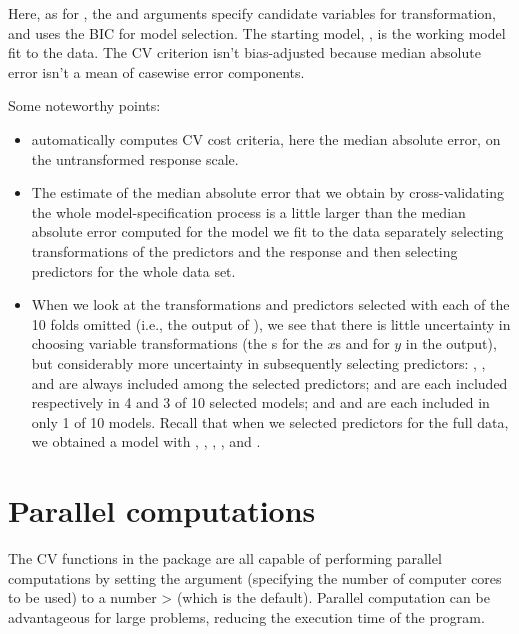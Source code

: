 \documentclass[
]{jss}
\providecommand{\tightlist}{%
  \setlength{\itemsep}{0pt}\setlength{\parskip}{0pt}}
\begin{document}
Here, as for , the  and
 arguments specify candidate variables for
transformation, and  uses the BIC for model selection.
The starting model, , is the working model fit to the
 data. The CV criterion isn't bias-adjusted because median
absolute error isn't a mean of casewise error components.

Some noteworthy points:

\begin{itemize}
\tightlist
\item
   automatically computes CV cost criteria,
  here the median absolute error, on the untransformed response scale.
\item
  The estimate of the median absolute error that we obtain by
  cross-validating the whole model-specification process is a little
  larger than the median absolute error computed for the model we fit to
  the  data separately selecting transformations of the
  predictors and the response and then selecting predictors for the
  whole data set.
\item
  When we look at the transformations and predictors selected with each
  of the 10 folds omitted (i.e., the output of ),
  we see that there is little uncertainty in choosing variable
  transformations (the s for the \(x\)s and 
  for \(y\) in the output), but considerably more uncertainty in
  subsequently selecting predictors: , ,
  and  are always included among the selected predictors;
   and  are each included
  respectively in 4 and 3 of 10 selected models; and 
  and  are each included in only 1 of 10 models. Recall
  that when we selected predictors for the full data, we obtained a
  model with , , ,
  , and .
\end{itemize}

\hypertarget{parallel-computations}{%
\section{Parallel computations}\label{parallel-computations}}

The CV functions in the  package are all capable of performing
parallel computations by setting the  argument (specifying
the number of computer cores to be used) to a number \textgreater{}
 (which is the default). Parallel computation can be
advantageous for large problems, reducing the execution time of the
program.
\end{document}
